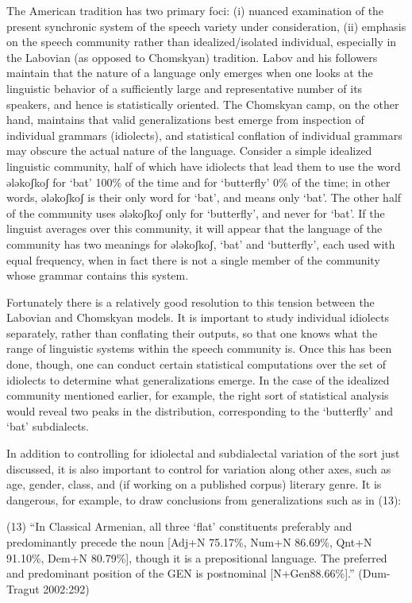 The American tradition has two primary foci: (i) nuanced examination of the present synchronic system of the speech variety under consideration, (ii) emphasis on the speech community rather than idealized/isolated individual, especially in the Labovian (as opposed to Chomskyan) tradition. Labov and his followers maintain that the nature of a language only emerges when one looks at the linguistic behavior of a sufficiently large and representative number of its speakers, and hence is statistically oriented. The Chomskyan camp, on the other hand, maintains that valid generalizations best emerge from inspection of individual grammars (idiolects), and statistical conflation of individual grammars may obscure the actual nature of the language. Consider a simple idealized linguistic community, half of which have idiolects that lead them to use the word ələkoʃkoʃ for ‘bat’ 100\% of the time and for ‘butterfly’ 0\% of the time; in other words, ələkoʃkoʃ is their only word for ‘bat’, and means only ‘bat’. The other half of the community uses ələkoʃkoʃ only for ‘butterfly’, and never for ‘bat’. If the linguist averages over this community, it will appear that the language of the community has two meanings for ələkoʃkoʃ, ‘bat’ and ‘butterfly’, each used with equal frequency, when in fact there is not a single member of the community whose grammar contains this system.

Fortunately there is a relatively good resolution to this tension between the Labovian and Chomskyan models. It is important to study individual idiolects separately, rather than conflating their outputs, so that one knows what the range of linguistic systems within the speech community is. Once this has been done, though, one can conduct certain statistical computations over the set of idiolects to determine what generalizations emerge. In the case of the idealized community mentioned earlier, for example, the right sort of statistical analysis would reveal two peaks in the distribution, corresponding to the ‘butterfly’ and ‘bat’ subdialects.

In addition to controlling for idiolectal and subdialectal variation of the sort just discussed, it is also important to control for variation along other axes, such as age, gender, class, and (if working on a published corpus) literary genre. It is dangerous, for example, to draw conclusions from generalizations such as in (13):

\begin{exe}
	(13) “In Classical Armenian, all three ‘flat’ constituents preferably and predominantly precede the noun [Adj+N 75.17\%, Num+N 86.69\%, Qnt+N 91.10\%, Dem+N 80.79\%], though it is a prepositional language. The preferred and predominant position of the GEN is postnominal [N+Gen88.66\%].” (Dum-Tragut 2002:292)
\end{exe}








